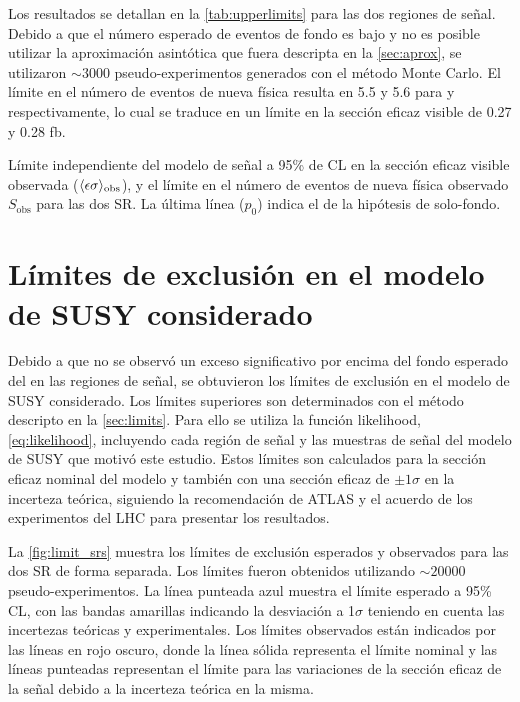 Los resultados se detallan en la \cref{tab:upperlimits} para las dos regiones de
señal. Debido a que el número esperado de eventos de fondo es bajo y no es
posible utilizar la aproximación asintótica que fuera descripta en la \cref{sec:aprox},
se utilizaron $\sim 3000$
pseudo-experimentos generados con el método Monte Carlo. El límite en el número
de eventos de nueva física resulta en 5.5 y 5.6 para {\SRL} y {\SRH}
respectivamente, lo cual se traduce en un límite en la sección eficaz visible de
0.27 y 0.28 fb.


\begin{table}[!htbp]
  \centering

  \caption{Límite independiente del modelo de señal a 95\% de CL en la
    sección eficaz visible observada ($\langle\epsilon{\rm \sigma}\rangle_{\rm obs}$),
    y el límite en el número de eventos de nueva física observado
    $S_\text{obs}$ para las dos SR.
    La última línea ($p_0$) indica el {\pvalue} de la hipótesis de solo-fondo.}
  \label{tab:upperlimits}

  

\end{table}


\clearpage


\section{Límites de exclusión en el modelo de SUSY considerado}
\label{sec:susy_limits}

Debido a que no se observó un exceso significativo por encima del fondo esperado
del {\SM} en las regiones de señal, se obtuvieron los límites de exclusión en el
modelo de SUSY considerado. Los límites superiores son determinados con el
método {\cls} descripto en la \cref{sec:limits}. Para ello se utiliza la función
likelihood, \cref{eq:likelihood}, incluyendo cada región de señal y las muestras
de señal del modelo de SUSY que motivó este estudio.
Estos límites son
calculados para la sección eficaz nominal del modelo y también con una sección
eficaz de $\pm 1 \sigma$ en la incerteza teórica, siguiendo la recomendación de
ATLAS y el acuerdo de los experimentos del LHC para presentar los resultados.

La \cref{fig:limit_srs} muestra los límites de exclusión esperados y
observados para las dos SR de forma separada. Los límites fueron obtenidos
utilizando $\sim 20000$ pseudo-experimentos. La línea punteada azul muestra el
límite esperado a 95\% CL, con las bandas amarillas indicando la desviación a
1$\sigma$ teniendo en cuenta las incertezas teóricas y experimentales. Los
límites observados están indicados por las líneas en rojo oscuro, donde la línea
sólida representa el límite nominal y las líneas punteadas representan el límite
para las variaciones de la sección eficaz de la señal debido a la incerteza
teórica en la misma.

